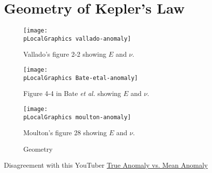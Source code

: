 % 

\section{Geometry of Kepler's Law}
\label{sec:geo}

\begin{figure}[htbp] %
\centering
\begin{center}
   \texttt{[image: \\pLocalGraphics vallado-anomaly]} 
   \caption{Vallado's figure 2-2 showing $E$ and $\nu$.}
\end{center}
   \label{fig:anomaly-vallado}
\end{figure}

\begin{figure}[htbp] %
\begin{center}
   \texttt{[image: \\pLocalGraphics Bate-etal-anomaly]} 
   \caption{Figure 4-4 in Bate \emph{et al.}  showing $E$ and $\nu$.}
\end{center}
   \label{fig:anomaly-bate}
\end{figure}

\begin{figure}[htbp] %
   \centering
   \texttt{[image: \\pLocalGraphics moulton-anomaly]} 
   \caption{Moulton's figure 28 showing $E$ and $\nu$.}
   \label{fig:anomaly-mouton}
\end{figure}

\begin{figure}[htbp] %
\centering
{}
\caption{Geometry}
\label{fig:ellipse-circle}
\end{figure}


Disagreement with this YouTuber \href{https://www.youtube.com/watch?v=cf9Jh44kL20}{True Anomaly vs. Mean Anomaly}

\endinput  %
